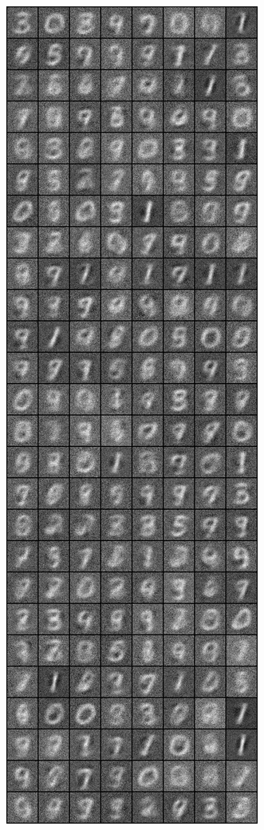 \begin{figure}
\includegraphics[width=\picwidth\columnwidth]{figures/supplementary/mnist/image_1000.png}

\end{figure}
